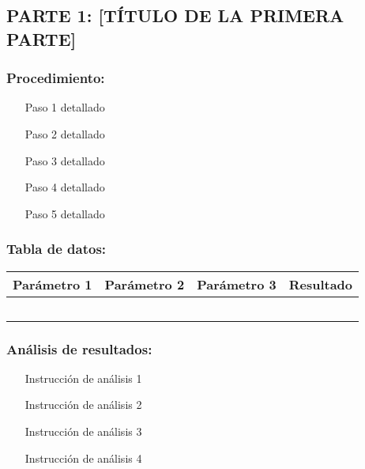 \documentclass[12pt,a4paper]{article}
\begin{document}
	\subsection{PARTE 1: [TÍTULO DE LA PRIMERA PARTE]}
	
	\subsubsection{Procedimiento:}
	\begin{enumerate}
		\item [Paso 1 detallado]
		\item [Paso 2 detallado]
		\item [Paso 3 detallado]
		\item [Paso 4 detallado]
		\item [Paso 5 detallado]
	\end{enumerate}
	
	\subsubsection{Tabla de datos:}
	
	\begin{center}
		\begin{tabular}{|c|c|c|c|}
			\hline
			\textbf{Parámetro 1} & \textbf{Parámetro 2} & \textbf{Parámetro 3} & \textbf{Resultado} \\
			\hline
			& & & \\
			\hline
			& & & \\
			\hline
			& & & \\
			\hline
			& & & \\
			\hline
			& & & \\
			\hline
		\end{tabular}
	\end{center}
	
	\subsubsection{Análisis de resultados:}
	\begin{enumerate}
		\item [Instrucción de análisis 1]
		\item [Instrucción de análisis 2]
		\item [Instrucción de análisis 3]
		\item [Instrucción de análisis 4]
	\end{enumerate}
	
\end{document}
